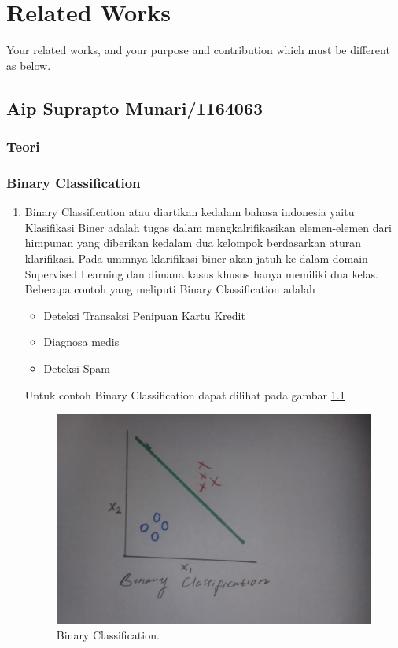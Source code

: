 \chapter{Related Works}

Your related works, and your purpose and contribution which must be different as below.

\section{Aip Suprapto Munari/1164063}
\subsection{Teori}
\subsection{Binary Classification}
\begin{enumerate}
\item Binary Classification atau diartikan kedalam bahasa indonesia yaitu Klasifikasi Biner adalah tugas dalam mengkalrifikasikan elemen-elemen dari himpunan yang diberikan kedalam dua kelompok berdasarkan aturan klarifikasi. Pada ummnya klarifikasi biner akan jatuh ke dalam domain Supervised Learning dan dimana kasus khusus hanya memiliki dua kelas. Beberapa contoh yang meliputi Binary Classification adalah \begin{itemize}
		\item Deteksi Transaksi Penipuan Kartu Kredit
		\item Diagnosa medis
		\item Deteksi Spam
	\end{itemize}
\subitem Untuk contoh Binary Classification dapat dilihat pada gambar \ref{1}
		\begin{figure}[ht]
		\centerline{\includegraphics[width=1\textwidth]{figures/AIP/1.JPEG}}
		\caption{Binary Classification.}
		\label{1}
		\end{figure}
 \end{enumerate}

